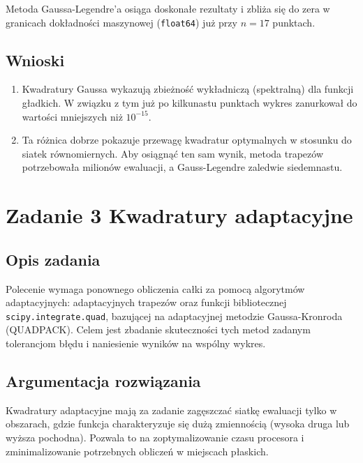 \documentclass[12pt, a4paper]{article}
\begin{document}
Metoda Gaussa-Legendre'a osiąga doskonałe rezultaty i zbliża się do zera w granicach dokładności maszynowej (\texttt{float64}) już przy $n=17$ punktach.

\subsection{Wnioski}

\begin{enumerate}
    \item Kwadratury Gaussa wykazują zbieżność wykładniczą (spektralną) dla funkcji gładkich. W związku z tym już po kilkunastu punktach wykres zanurkował do wartości mniejszych niż $10^{-15}$.
    \item Ta różnica dobrze pokazuje przewagę kwadratur optymalnych w stosunku do siatek równomiernych. Aby osiągnąć ten sam wynik, metoda trapezów potrzebowała milionów ewaluacji, a Gauss-Legendre zaledwie siedemnastu.
\end{enumerate}

\section{Zadanie 3 \textendash{} Kwadratury adaptacyjne}

\subsection{Opis zadania}

Polecenie wymaga ponownego obliczenia całki za pomocą algorytmów adaptacyjnych: adaptacyjnych trapezów oraz funkcji bibliotecznej \texttt{scipy.integrate.quad}, bazującej na adaptacyjnej metodzie Gaussa-Kronroda (QUADPACK). Celem jest zbadanie skuteczności tych metod zadanym tolerancjom błędu i naniesienie wyników na wspólny wykres.

\subsection{Argumentacja rozwiązania}

Kwadratury adaptacyjne mają za zadanie zagęszczać siatkę ewaluacji tylko w obszarach, gdzie funkcja charakteryzuje się dużą zmiennością (wysoka druga lub wyższa pochodna). Pozwala to na zoptymalizowanie czasu procesora i zminimalizowanie potrzebnych obliczeń w miejscach płaskich.
\end{document}
